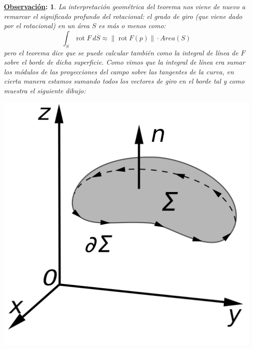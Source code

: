 \documentclass[10pt,a4paper,openright]{book}
\theoremstyle{break}
\newtheorem*{obs}{\underline{Observación}:}
\DeclareMathOperator{\rot}{rot}
\newcommand{\dif}[1]{\ d#1}
\begin{document}
\begin{obs}
La interpretación geométrica del teorema nos viene de nuevo a remarcar el significado profundo del rotacional: el grado de giro (que viene dado por el rotacional) en un área $S$ es más o menos como:
$$\int_{S} \rot F \dif{\overline{S}} \approx \lVert \rot F \left( p \right) \rVert \cdot Area\left( S \right)$$
pero el teorema dice que se puede calcular también como la integral de línea de $F$ sobre el borde de dicha superficie. Como vimos que la integral de línea era sumar los módulos de las proyecciones del campo sobre las tangentes de la curva, en cierta manera estamos sumando todos los vectores de giro en el borde tal y como muestra el siguiente dibujo:
\begin{center}
    \includegraphics[scale=0.1]{stokeTh} 
\end{center}
\end{obs}
\end{document}
